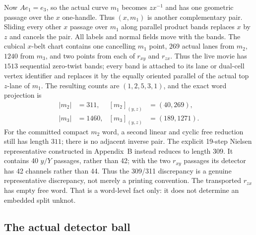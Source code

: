 \documentclass[11pt]{amsart}
\theoremstyle{definition}
\theoremstyle{remark}
\begin{document}
Now $Ae_1=e_3$, so the actual curve $m_1$ becomes $zx^{-1}$ and has one
geometric passage over the $x$ one-handle.  Thus $(x,m_1)$ is another
complementary pair.  Sliding every other $x$ passage over $m_1$ along parallel
product bands replaces $x$ by $z$ and cancels the pair.  All labels and
normal fields move with the bands.
The cubical $x$-belt chart contains one cancelling $m_1$ point, $269$ actual
lanes from $m_2$, $1240$ from $m_3$, and two points from each of $r_{xy}$ and
$r_{zx}$.  Thus the live movie has $1513$ sequential zero-twist bands; every
band is attached to its lane or dual-cell vertex identifier and replaces it
by the equally oriented parallel of the actual top $z$-lane of $m_1$.
The resulting counts are $(1,2,5,3,1)$,
and the exact word projection is
\[
\begin{aligned}
|m_2|&=311, & [m_2]_{(y,z)}&=(40,269),\\
|m_3|&=1460, & [m_3]_{(y,z)}&=(189,1271).
\end{aligned}
\]
For the committed compact $m_2$ word, a second linear and cyclic free
reduction still has length $311$; there is no adjacent inverse pair.  The
explicit 19-step Nielsen representative constructed in Appendix~B instead
reduces to length $309$.  It contains 40 $y/Y$ passages, rather than 42; with
the two $r_{xy}$ passages its detector has 42 channels rather than 44.  Thus
the 309/311 discrepancy is a genuine representative discrepancy, not merely
a printing convention.
The transported $r_{zx}$ has empty free word.  That is a word-level fact
only: it does not determine an embedded split unknot.

\subsection{The actual detector ball}
\end{document}
